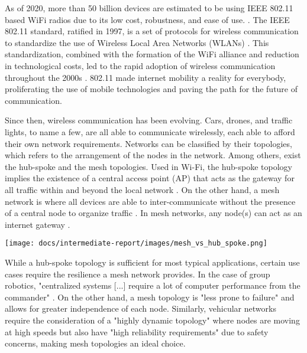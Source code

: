 \documentclass[compsoc]{IEEEtran}
\begin{document}
As of 2020, more than 50 billion devices are estimated to be using IEEE 802.11 based WiFi radios due to its low cost, robustness, and ease of use. \cite{G_Davis_2018}. The IEEE 802.11 standard, ratified in 1997, is a set of protocols for wireless communication to standardize the use of Wireless Local Area Networks (WLANs) \cite{perahia2013next}. This standardization, combined with the formation of the WiFi alliance and reduction in technological costs, led to the rapid adoption of wireless communication throughout the 2000s \cite{perahia2013next}. 802.11 made internet mobility a reality for everybody, proliferating the use of mobile technologies and paving the path for the future of communication. 


Since then, wireless communication has been evolving. Cars, drones, and traffic lights, to name a few, are all able to communicate wirelessly, each able to afford their own network requirements. Networks can be classified by their topologies, which refers to the arrangement of the nodes in the network. Among others, exist the hub-spoke and the mesh topologies. Used in Wi-Fi, the hub-spoke topology implies the existence of a central access point (AP) that acts as the gateway for all traffic within and beyond the local network \cite{ti_lethaby2017wireless}. On the other hand, a mesh network is where all devices are able to inter-communicate without the presence of a central node to organize traffic \cite{ti_lethaby2017wireless}. In mesh networks, any node(s) can act as an internet gateway \cite{ti_lethaby2017wireless}. 

\begingroup
    \centering
    \medskip
    \texttt{[image: docs/intermediate-report/images/mesh\_vs\_hub\_spoke.png]}
    \label{fig:consensus_mesh}
\endgroup

While a hub-spoke topology is sufficient for most typical applications, certain use cases require the resilience a mesh network provides. In the case of group robotics, "centralized systems [...] require a lot of computer performance from the commander" \cite{manet_drone_semenova2015network}. On the other hand, a mesh topology is "less prone to failure" \cite{manet_drone_semenova2015network} and allows for greater independence of each node. Similarly, vehicular networks require the consideration of a "highly dynamic topology" \cite{iov_wu2016internet} where nodes are moving at high speeds but also have "high reliability requirements" \cite{iov_wu2016internet} due to safety concerns, making mesh topologies an ideal choice. 
\end{document}
